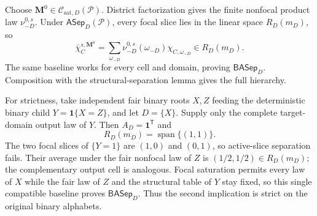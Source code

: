 Choose \(\mathbf M^0\in\mathcal C_{\mathrm{sat},D}(\mathcal P)\).  District factorization gives the finite nonfocal product law \(\nu_{-D}^{0,s}\).  Under \(\mathsf{ASep}_D(\mathcal P)\), every focal slice lies in the linear space \(R_D(m_D)\), so
\[
\bar\chi_C^{s,\mathbf M^0}
=\sum_{\omega_{-D}}
\nu_{-D}^{0,s}(\omega_{-D})
\chi_{C,\omega_{-D}}
\in R_D(m_D).
\tag{1}
\]
The same baseline works for every cell and domain, proving \(\mathsf{BASep}_D\).  Composition with the structural-separation lemma gives the full hierarchy.

For strictness, take independent fair binary roots \(X,Z\) feeding the deterministic binary child \(Y=\mathbf 1\{X=Z\}\), and let \(D=\{X\}\).  Supply only the complete target-domain output law of \(Y\).  Then \(A_D=\mathbf 1^{\mathsf T}\) and
\[
R_D(m_D)=\operatorname{span}\{(1,1)\}.
\]
The two focal slices of \(\{Y=1\}\) are \((1,0)\) and \((0,1)\), so active-slice separation fails.  Their average under the fair nonfocal law of \(Z\) is \((1/2,1/2)\in R_D(m_D)\); the complementary output cell is analogous.  Focal saturation permits every law of \(X\) while the fair law of \(Z\) and the structural table of \(Y\) stay fixed, so this single compatible baseline proves \(\mathsf{BASep}_D\).  Thus the second implication is strict on the original binary alphabets.